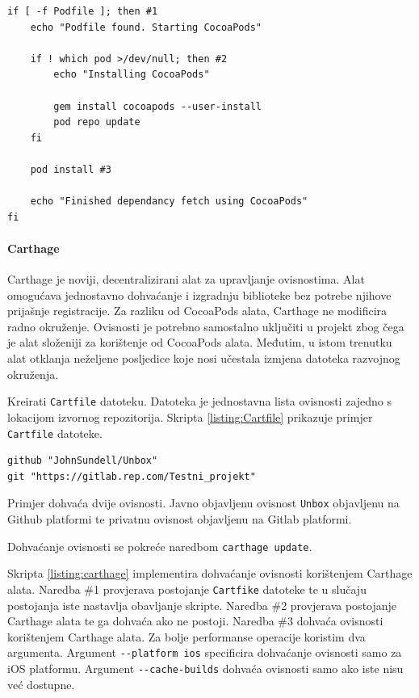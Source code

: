 \documentclass[times, utf8, diplomski, numeric]{fer}
\begin{document}
\begin{lstlisting}[caption=Dohvat ovisnosti korištenjem alata CocoaPods, label=listing:cocoapods]
if [ -f Podfile ]; then #1
    echo "Podfile found. Starting CocoaPods"

    if ! which pod >/dev/null; then #2
        echo "Installing CocoaPods"

        gem install cocoapods --user-install
        pod repo update
    fi

    pod install #3

    echo "Finished dependancy fetch using CocoaPods"
fi
\end{lstlisting}

\paragraph{Carthage}

Carthage je noviji, decentralizirani alat za upravljanje ovisnostima. Alat omogućava jednostavno dohvaćanje i izgradnju biblioteke bez potrebe njihove prijašnje registracije. Za razliku od CocoaPods alata, Carthage ne modificira radno okruženje. Ovisnosti je potrebno samostalno uključiti u projekt zbog čega je alat složeniji za korištenje od CocoaPods alata. Međutim, u istom trenutku alat otklanja neželjene posljedice koje nosi učestala izmjena datoteka razvojnog okruženja.

Kreirati \verb|Cartfile| datoteku. Datoteka je jednostavna lista ovisnosti zajedno s lokacijom izvornog repozitorija. Skripta \ref{listing:Cartfile} prikazuje primjer \verb|Cartfile| datoteke.

\begin{lstlisting}[caption=Primjer Cartfile datoteke, label=listing:Cartfile]
github "JohnSundell/Unbox"
git "https://gitlab.rep.com/Testni_projekt"
\end{lstlisting}

Primjer dohvaća dvije ovisnosti. Javno objavljenu ovisnost \verb|Unbox| objavljenu na Github platformi te privatnu ovisnost objavljenu na Gitlab platformi.

Dohvaćanje ovisnosti se pokreće naredbom \verb|carthage update|.

Skripta \ref{listing:carthage} implementira dohvaćanje ovisnosti korištenjem Carthage alata. Naredba \#1 provjerava postojanje \verb|Cartfike| datoteke te u slučaju postojanja iste nastavlja obavljanje skripte. Naredba \#2 provjerava postojanje Carthage alata te ga dohvaća ako ne postoji. Naredba \#3 dohvaća ovisnosti korištenjem Carthage alata. Za bolje performanse operacije koristim dva argumenta. Argument \verb|--platform ios| specificira dohvaćanje ovisnosti samo za iOS platformu. Argument \verb|--cache-builds| dohvaća ovisnosti samo ako iste nisu već dostupne.
\end{document}

